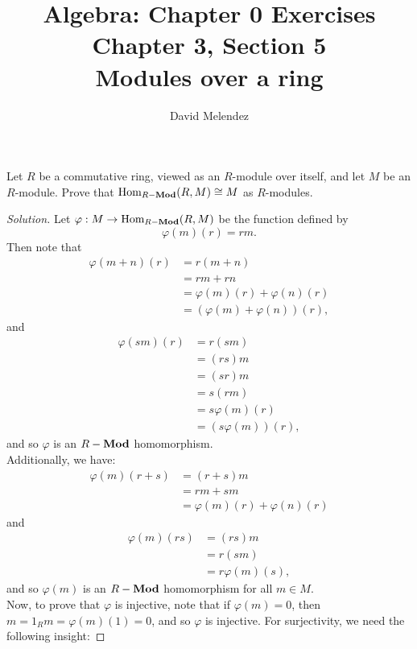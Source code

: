 \documentclass[12pt]{article}
\newenvironment{problem}[2][Problem]{\begin{trivlist}
\item[\hskip \labelsep {\bfseries #1}\hskip \labelsep {\bfseries #2.}]}{\end{trivlist}}
\newcommand{\catname}[1]{\normalfont\textbf{#1}}
\newcommand{\Hom}{\text{Hom}}
\newcommand{\Homod}[2]{\Hom_{#1-\catname{Mod}}(#2)}
\newenvironment{solution}
  {\renewcommand\qedsymbol{$\blacksquare$}\begin{proof}[Solution]}
{\end{proof}}
\theoremstyle{remark}
\begin{document}
\title{Algebra: Chapter 0 Exercises\\ \large Chapter 3, Section 5\\ 
\large Modules over a ring}
\author{David Melendez}
\maketitle

\begin{problem}{5.5}
  Let $R$ be a commutative ring, viewed as an $R$-module over itself,
  and let $M$ be an $R$-module.
  Prove that $\Homod{R}{R,M}\cong M$ as $R$-modules.
\end{problem}
\begin{solution}
  Let $\varphi : M\to \Homod{R}{R,M}$ be the function defined by $$\varphi(m)(r)=rm.$$
  Then note that
  \begin{align*}
    \varphi(m+n)(r) &= r(m+n) \\
    &= rm + rn \\
    &= \varphi(m)(r) + \varphi(n)(r) \\
    &= (\varphi(m)+\varphi(n))(r),
  \end{align*}
  and 
  \begin{align*}
    \varphi(sm)(r) &= r(sm) \\
    &= (rs)m \\
    &= (sr)m \\
    &= s(rm) \\
    &= s\varphi(m)(r) \\
    &= (s\varphi(m))(r),
  \end{align*}
  and so $\varphi$ is an $R-\catname{Mod}$ homomorphism. \\
  Additionally, we have:
  \begin{align*}
    \varphi(m)(r+s) &= (r+s)m \\
    &= rm+sm \\
    &= \varphi(m)(r) + \varphi(n)(r)
  \end{align*}
  and 
  \begin{align*}
    \varphi(m)(rs) &= (rs)m \\
    &= r(sm) \\
    &= r\varphi(m)(s),
  \end{align*}
  and so $\varphi(m)$ is an $R-\catname{Mod}$ homomorphism for all $m\in M$. \\
  \indent Now, to prove that $\varphi$ is injective, note that if $\varphi(m) = 0$,
  then $m = 1_Rm = \varphi(m)(1) = 0$, and so $\varphi$ is injective.
  For surjectivity, we need the following insight: 

\end{solution}
\end{document}
